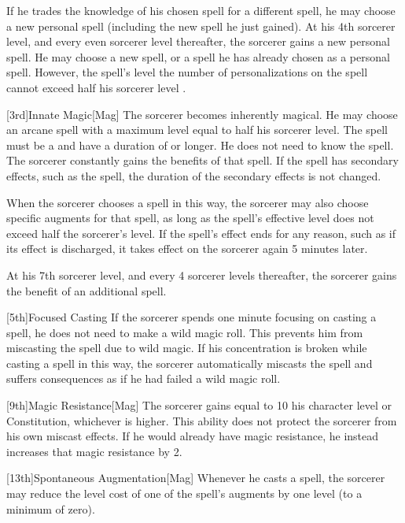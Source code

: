         If he trades the knowledge of his chosen spell for a different spell, he may choose a new personal spell (including the new spell he just gained).
        At his 4th sorcerer level, and every even sorcerer level thereafter, the sorcerer gains a new personal spell.
        He may choose a new spell, or a spell he has already chosen as a personal spell.
        However, the spell's level \add the number of personalizations on the spell cannot exceed half his sorcerer level .

        [3rd]{Innate Magic}[Mag]
        The sorcerer becomes inherently magical.
        He may choose an arcane spell with a maximum level equal to half his sorcerer level.
        The spell must be a  and have a duration of \durshort or longer.
        He does not need to know the spell.
        The sorcerer constantly gains the benefits of that spell.
        If the spell has secondary effects, such as the  spell, the duration of the secondary effects is not changed.

        When the sorcerer chooses a spell in this way, the sorcerer may also choose specific augments for that spell, as long as the spell's effective level does not exceed half the sorcerer's level.
        If the spell's effect ends for any reason, such as if its effect is discharged, it takes effect on the sorcerer again 5 minutes later.

        At his 7th sorcerer level, and every 4 sorcerer levels thereafter, the sorcerer gains the benefit of an additional spell.

        [5th]{Focused Casting}
        If the sorcerer spends one minute focusing on casting a spell, he does not need to make a wild magic roll.
        This prevents him from miscasting the spell due to wild magic.
        If his concentration is broken while casting a spell in this way, the sorcerer automatically miscasts the spell and suffers consequences as if he had failed a wild magic roll.

        [9th]{Magic Resistance}[Mag]
        The sorcerer gains  equal to 10 \add his character level or Constitution, whichever is higher.
        This ability does not protect the sorcerer from his own miscast effects.
        If he would already have magic resistance, he instead increases that magic resistance by 2.

        [13th]{Spontaneous Augmentation}[Mag]
        Whenever he casts a spell, the sorcerer may reduce the level cost of one of the spell's augments by one level (to a minimum of zero).


